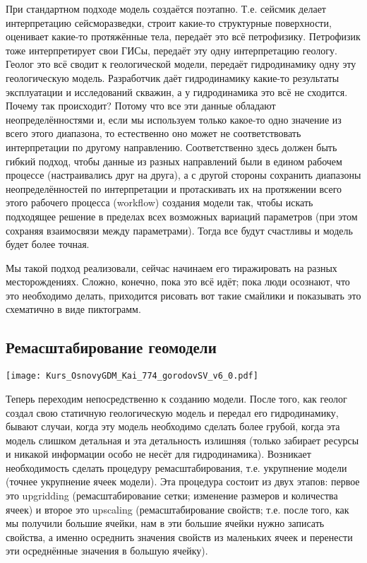 \documentclass[main.tex]{subfiles}
\begin{document}
При стандартном подходе модель создаётся поэтапно. Т.е. сейсмик делает интерпретацию сейсморазведки, строит какие-то структурные поверхности, оценивает какие-то протяжённые тела, передаёт это всё петрофизику.
Петрофизик тоже интерпретирует свои ГИСы, передаёт эту одну интерпретацию геологу.
Геолог это всё сводит к геологической модели, передаёт гидродинамику одну эту геологическую модель.
Разработчик даёт гидродинамику какие-то результаты эксплуатации и исследований скважин, а у гидродинамика это всё не сходится.
Почему так происходит? Потому что все эти данные обладают неопределённостями и, если мы используем только какое-то одно значение из всего этого диапазона, то естественно оно может не соответствовать интерпретации по другому направлению.
Соответственно здесь должен быть гибкий подход, чтобы данные из разных направлений были в едином рабочем процессе (настраивались друг на друга), а с другой стороны сохранить диапазоны неопределённостей по интерпретации и протаскивать их на протяжении всего этого рабочего процесса (workflow) создания модели так, чтобы искать подходящее решение в пределах всех возможных вариаций параметров (при этом сохраняя взаимосвязи между параметрами).
Тогда все будут счастливы и модель будет более точная.

Мы такой подход реализовали, сейчас начинаем его тиражировать на разных месторождениях.
Сложно, конечно, пока это всё идёт; пока люди осознают, что это необходимо делать, приходится рисовать вот такие смайлики и показывать это схематично в виде пиктограмм. 

\subsection{Ремасштабирование геомодели}

\texttt{[image: Kurs\_OsnovyGDM\_Kai\_774\_gorodovSV\_v6\_0.pdf]}

Теперь переходим непосредственно к созданию модели.
После того, как геолог создал свою статичную геологическую модель и передал его гидродинамику, бывают случаи, когда эту модель необходимо сделать более грубой, когда эта модель слишком детальная и эта детальность излишняя (только забирает ресурсы и никакой информации особо не несёт для гидродинамика).
Возникает необходимость сделать процедуру ремасштабирования, т.е. укрупнение модели (точнее укрупнение ячеек модели).
Эта процедура состоит из двух этапов: первое это upgridding (ремасштабирование сетки; изменение размеров и количества ячеек) и второе это upscaling (ремасштабирование свойств; т.е. после того, как мы получили большие ячейки, нам в эти большие ячейки нужно записать свойства, а именно осреднить значения свойств из маленьких ячеек и перенести эти осреднённые значения в большую ячейку).
\end{document}
